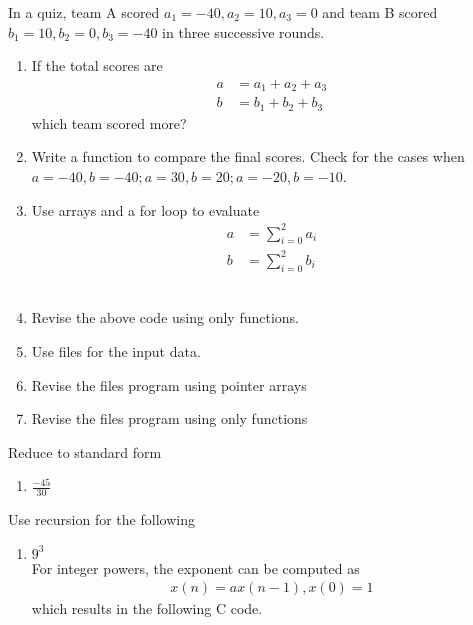 In a quiz, team A scored $a_1 = -40, a_2=10, a_3=0$ and team B scored $b_1=10, b_2=0, b_3=-40$ in three successive rounds.
\begin{enumerate}[label=\thesubsection.\arabic*, ref=\thesubsection.\theenumi]
\item  If the total scores are 
	\begin{align}
		a &= a_1+a_2+a_3
		\\
		b &= b_1+b_2+b_3
	\end{align}
	which team scored more? 
	\\
	\solution 
	
\item Write a function to compare the final scores.  Check for the cases when $a = -40, b = -40; a = 30, b = 20; a = -20, b = -10$.
	\\
	\solution 
	
\item Use arrays and a for loop to evaluate 
	\begin{align}
		a &= \sum_{i=0}^{2}a_i
		\\
		b &= \sum_{i=0}^{2}b_i
	\end{align}
	\\
	\solution 
	
\item Revise the above code using only functions.
	\\
	\solution 
	
\item Use files for the input data.
	\\
	\solution 
	
\item Revise the files program using pointer arrays
	\\
	\solution 
	
\item Revise the files program using only functions
	\\
	\solution 
	
\end{enumerate}
Reduce to standard form
\begin{enumerate}[label=\thesubsection.\arabic*, ref=\thesubsection.\theenumi,resume*,itemsep=1ex]
	\item $\frac{-45}{30}$
		\\
		\solution
	
\end{enumerate}
Use recursion for the following
\begin{enumerate}[label=\thesubsection.\arabic*, ref=\thesubsection.\theenumi,resume*]
		\item $9^3$
			\\
			\solution For integer powers, the exponent can be computed as
			\begin{align}
					x(n) = ax(n-1), x(0) = 1 
			\end{align}
			which results in the following C code.
	
\end{enumerate}

